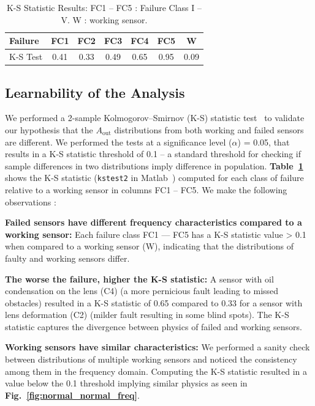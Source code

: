 \documentclass[manuscript]{acmart}
\newcommand{\aout}{$A_{\text{out}}$\xspace}
\begin{document}
\begin{table}
	\setlength\tabcolsep{2.5pt}
	\centering
	\caption{{K-S Statistic Results}: FC1 -- FC5 : Failure Class I -- V. W : working sensor.}
		\begin{tabular}{l c c c c c c}
			\hline
			\textbf{Failure} & \textbf{FC1} & \textbf{FC2} & \textbf{FC3} & \textbf{FC4} & \textbf{FC5} & \textbf{W} \\
			\hline \hline
			K-S Test & 0.41 & 0.33 & 0.49 & 0.65 & 0.95 & 0.09 \\
			\hline 
		\end{tabular}
	\label{tbl:ks_test_results}
\end{table}

\subsection{Learnability of the Analysis}
\label{subsec:learnability}

We performed a 2-sample Kolmogorov–Smirnov (K-S) statistic test~\cite{massey1951kolmogorov} to validate our hypothesis that the \aout distributions from both working and failed sensors are different.  We performed the tests at a significance level ($\alpha$) = 0.05, that results in a K-S statistic threshold of 0.1 -- a standard threshold for checking if sample differences in two distributions imply difference in population. {\bfseries Table~\ref{tbl:ks_test_results}} shows the K-S statistic (\texttt{kstest2} in Matlab~\cite{mathworks2015kstest2}) computed for each class of failure relative to a working sensor in columns FC1 -- FC5. We make the following observations :

\noindent \textbf{Failed sensors have different frequency characteristics compared to a working sensor:} Each failure class FC1 --- FC5 has a K-S statistic value > 0.1 when compared to a working sensor (W), indicating that the distributions of faulty and working sensors differ. 

\noindent \textbf{The worse the failure, higher the K-S statistic:} A sensor with oil condensation on the lens (C4) (a more pernicious fault leading to missed obstacles) resulted in a K-S statistic of 0.65 compared to 0.33 for a sensor with lens deformation (C2) (milder fault resulting in some blind spots). The K-S statistic captures the divergence between physics of failed and working sensors.


\noindent \textbf{Working sensors have similar characteristics:} We performed a sanity check between distributions of multiple working sensors and noticed the consistency among them in the frequency domain. Computing the K-S statistic resulted in a value below the 0.1 threshold implying similar physics as seen in {\bfseries Fig.~\ref{fig:normal_normal_freq}}.
\end{document}
